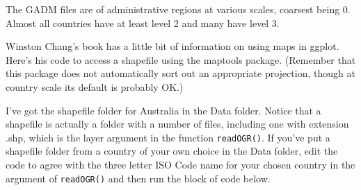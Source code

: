 \documentclass[titlepage]{book}\usepackage{knitr}
\begin{document}
The GADM files are of administrative regions at various scales, coarsest being 0. Almost all countries have at least level 2 and many have level 3.

Winston Chang's book has a little bit of information on using maps in ggplot. Here's his code to access a shapefile using the maptools package. (Remember that this package does not automatically sort out an appropriate projection, though at country scale its default is probably OK.) 


I've got the shapefile folder for Australia in the Data folder. Notice that a shapefile is actually a folder with a number of files, including one with extension .shp, which is the layer argument in the function \texttt{readOGR()}. If you've put a shapefile folder from a country of your own choice in the Data folder, edit the code to agree with the three letter ISO Code name for your chosen country in the argument of \texttt{readOGR()} and then run the block of code below.

\begin{knitrout}
\color{fgcolor}\begin{kframe}
\begin{alltt}
 \hlkwb{<-} \hlstd{(} \hlstd{=} \hlstd{,}  \hlstd{=}\hlstd{)}  
                                                     
\hlstd{)}                                                 
                                                      
 \hlkwb{<-}                                           
                                                   

 \hlkwb{<-}  \hlstd{(}   
  \hlopt{+} \hlstd{()}

 \hlkwb{<-}  \hlopt{+} \hlstd{(}\hlstd{)}

 \hlkwb{=}  \hlopt{+} \hlstd{(}\hlstd{,}  \hlstd{=} \hlstd{(}\hlopt{-}\hlstd{,} \hlstd{,} \hlstd{))}

\end{alltt}
\end{kframe}
\end{knitrout}
\end{document}
